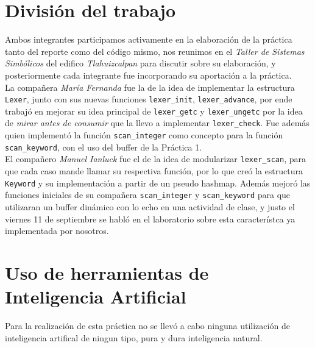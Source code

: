 \documentclass[12pt,letterpaper]{article}
\begin{document}
\section*{División del trabajo}

Ambos integrantes participamos activamente en la elaboración de la práctica tanto del reporte como del código
mismo, nos reunimos en el \textit{Taller de Sistemas Simbólicos} del edifico \textit{Tlahuizcalpan} para
discutir sobre su elaboración, y posteriormente cada integrante fue incorporando su aportación a la práctica.\\

La compañera \textit{María Fernanda} fue la de la idea de implementar la estructura \texttt{Lexer}, junto con
sus nuevas funciones \texttt{lexer\_init}, \texttt{lexer\_advance}, por ende trabajó en mejorar su idea
principal de \texttt{lexer\_getc} y \texttt{lexer\_ungetc} por la idea de \textit{mirar antes de consumir}
que la llevo a implementar \texttt{lexer\_check}. Fue además quien implementó la función \texttt{scan\_integer}
como concepto para la función \texttt{scan\_keyword}, con el uso del buffer de la Práctica 1.\\

El compañero \textit{Manuel Ianluck} fue el de la idea de modularizar \texttt{lexer\_scan}, para que cada caso
mande llamar su respectiva función, por lo que creó la estructura \texttt{Keyword} y su implementación a partir
de un pseudo hashmap. Además mejoró las funciones iniciales de su compañera \texttt{scan\_integer} y
\texttt{scan\_keyword} para que utilizaran un buffer dinámico con lo echo en una actividad de clase, y justo el
viernes 11 de septiembre se habló en el laboratorio sobre esta característca ya implementada por nosotros.

\section*{Uso de herramientas de Inteligencia Artificial}

Para la realización de esta práctica no se llevó a cabo ninguna utilización de inteligencia artifical de ningun
tipo, pura y dura inteligencia natural.

\end{document}
